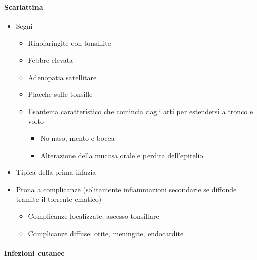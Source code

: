 \documentclass[italian,]{article}
\providecommand{\tightlist}{%
  \setlength{\itemsep}{0pt}\setlength{\parskip}{0pt}}
\begin{document}
\hypertarget{scarlattina}{%
\paragraph{Scarlattina}\label{scarlattina}}

\begin{itemize}
\tightlist
\item
  Segni

  \begin{itemize}
  \tightlist
  \item
    Rinofaringite con tonsillite
  \item
    Febbre elevata
  \item
    Adenopatia satellitare
  \item
    Placche sulle tonsille
  \item
    Esantema caratteristico che comincia dagli arti per estendersi a
    tronco e volto

    \begin{itemize}
    \tightlist
    \item
      No naso, mento e bocca
    \item
      Alterazione della mucosa orale e perdita dell'epitelio
    \end{itemize}
  \end{itemize}
\item
  Tipica della prima infazia
\item
  Prona a complicanze (solitamente infiammazioni secondarie se diffonde
  tramite il torrente ematico)

  \begin{itemize}
  \tightlist
  \item
    Complicanze localizzate: ascesso tonsillare
  \item
    Complicanze diffuse: otite, meningite, endocardite
  \end{itemize}
\end{itemize}

\hypertarget{infezioni-cutanee}{%
\paragraph{Infezioni cutanee}\label{infezioni-cutanee}}
\end{document}
